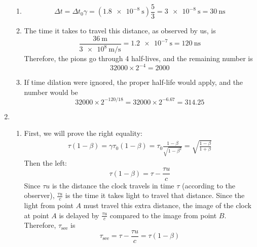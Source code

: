 \documentclass[fleqn]{article}[12pt]
\begin{document}
\begin{enumerate}
\begin{enumerate}
        \item
        \begin{equation*}
            \Delta t = \Delta t_0 \gamma = (\SI{1.8e-8}{\s})\frac{5}{3} = \SI{3e-8}{\s} = \SI{30}{\nano\second}
        \end{equation*}

        \item The time it takes to travel this distance, as observed by us, is
        \begin{equation*}
            \frac{\SI{36}{\m}}{\SI{3e8}{\m/\s}} = \SI{1.2e-7}{\s} = \SI{120}{\nano\second}
        \end{equation*}
        Therefore, the pions go through 4 half-lives, and the remaining number is
        \begin{equation*}
            32000 \times 2^{-4} = 2000
        \end{equation*}

        \item If time dilation were ignored, the proper half-life would apply, and the number would be
        \begin{equation}
            32000 \times 2^{-120/18} = 32000\times2^{-6.67} = 314.25
        \end{equation}
    \end{enumerate}

    \item \begin{enumerate}
        \item First, we will prove the right equality:
        \begin{align*}
            \tau (1-\beta) = \gamma \tau_0 (1-\beta) = \tau_0 \frac{1-\beta}{\sqrt{1-\beta^2}} = \sqrt{\frac{1-\beta}{1+\beta}}
        \end{align*}
        Then the left:
        \begin{equation*}
            \tau(1-\beta) = \tau - \frac{\tau u}{c}
        \end{equation*}
        Since $\tau u$ is the distance the clock travels in time $\tau$ (according to the observer), $\frac{\tau u}{c}$ is the time it takes light to travel that distance. Since the light from point $A$ must travel this extra distance, the image of the clock at point $A$ is delayed by $\frac{\tau u}{c}$ compared to the image from point $B$. Therefore, $\tau_{\text{see}}$ is
        \begin{equation*}
            \tau_{\text{see}} = \tau - \frac{\tau u}{c} = \tau(1-\beta)
        \end{equation*}


\end{enumerate}
\end{enumerate}
\end{document}
